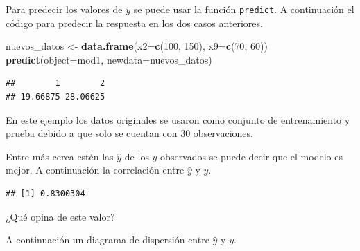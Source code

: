 \documentclass[]{book}
\makeatletter
\newenvironment{Shaded}{\begin{snugshade}}{\end{snugshade}}
\newcommand{\DataTypeTok}[1]{\textcolor[rgb]{0.13,0.29,0.53}{#1}}
\newcommand{\DecValTok}[1]{\textcolor[rgb]{0.00,0.00,0.81}{#1}}
\newcommand{\KeywordTok}[1]{\textcolor[rgb]{0.13,0.29,0.53}{\textbf{#1}}}
\newcommand{\NormalTok}[1]{#1}
\newcommand{\OperatorTok}[1]{\textcolor[rgb]{0.81,0.36,0.00}{\textbf{#1}}}
\newcommand{\StringTok}[1]{\textcolor[rgb]{0.31,0.60,0.02}{#1}}
\newenvironment{kframe}{%
\medskip{}
\setlength{\fboxsep}{.8em}
 \def\at@end@of@kframe{}%
 \ifinner\ifhmode%
  \def\at@end@of@kframe{\end{minipage}}%
  \begin{minipage}{\columnwidth}%
 \fi\fi%
 \def\FrameCommand##1{\hskip\@totalleftmargin \hskip-\fboxsep
 \colorbox{shadecolor}{##1}\hskip-\fboxsep
     \hskip-\linewidth \hskip-\@totalleftmargin \hskip\columnwidth}%
 \MakeFramed {\advance\hsize-\width
   \@totalleftmargin\z@ \linewidth\hsize
   \@setminipage}}%
 {\par\unskip\endMakeFramed%
 \at@end@of@kframe}
\renewenvironment{Shaded}{\begin{kframe}}{\end{kframe}}
\makeatother
\begin{document}
Para predecir los valores de \(y\) se puede usar la función \texttt{predict}. A continuación el código para predecir la respuesta en los dos casos anteriores.

\begin{Shaded}
\begin{Highlighting}[]
\NormalTok{nuevos_datos <-}\StringTok{ }\KeywordTok{data.frame}\NormalTok{(}\DataTypeTok{x2=}\KeywordTok{c}\NormalTok{(}\DecValTok{100}\NormalTok{, }\DecValTok{150}\NormalTok{), }\DataTypeTok{x9=}\KeywordTok{c}\NormalTok{(}\DecValTok{70}\NormalTok{, }\DecValTok{60}\NormalTok{))}
\KeywordTok{predict}\NormalTok{(}\DataTypeTok{object=}\NormalTok{mod1, }\DataTypeTok{newdata=}\NormalTok{nuevos_datos)}
\end{Highlighting}
\end{Shaded}

\begin{verbatim}
##        1        2 
## 19.66875 28.06625
\end{verbatim}

En este ejemplo los datos originales se usaron como conjunto de entrenamiento y prueba debido a que solo se cuentan con 30 observaciones.

Entre más cerca estén las \(\hat{y}\) de los \(y\) observados se puede decir que el modelo es mejor. A continuación la correlación entre \(\hat{y}\) y \(y\).

\begin{Shaded}
\end{Shaded}

\begin{verbatim}
## [1] 0.8300304
\end{verbatim}

¿Qué opina de este valor?

A continuación un diagrama de dispersión entre \(\hat{y}\) y \(y\).

\begin{Shaded}
\end{Shaded}
\end{document}
